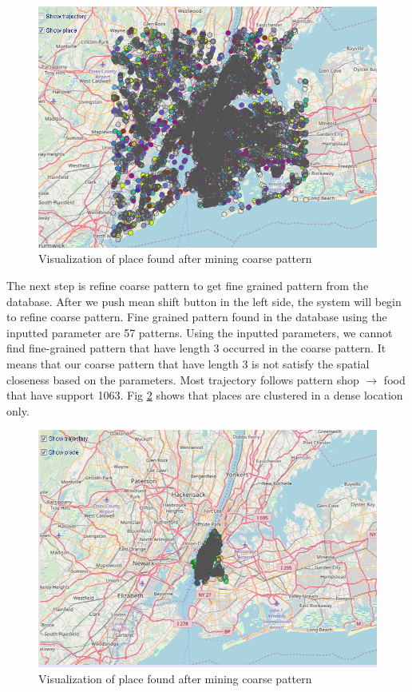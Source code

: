 \documentclass[conference]{IEEEtran}
\begin{document}
\begin{figure}[h!]
	\centering
	\includegraphics[width=1\linewidth]{mapCoarse}
	\caption{Visualization of place found after mining coarse pattern}
	\label{fig:mapcoarse}
\end{figure}

The next step is refine coarse pattern to get fine grained pattern from the database. After we push mean shift button in the left side, the system will begin to refine coarse pattern. Fine grained pattern found in the database using the inputted parameter are 57 patterns. Using the inputted parameters, we cannot find fine-grained pattern that have length 3 occurred in the coarse pattern. It means that our coarse pattern that have length 3 is not satisfy the spatial closeness based on the parameters. Most trajectory follows pattern shop $\rightarrow$ food that have support 1063. Fig \ref{fig:maprefine} shows that places are clustered in a dense location only.    
\begin{figure}[h!]
	\centering
	\includegraphics[width=1\linewidth]{mapRefine}
	\caption{Visualization of place found after mining coarse pattern}
	\label{fig:maprefine}
\end{figure}
\end{document}
